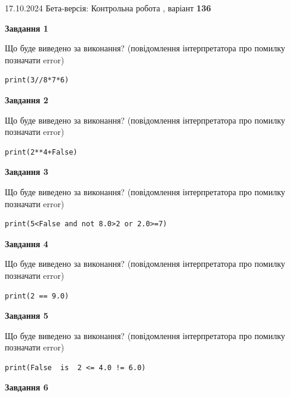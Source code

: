 \documentclass[12pt, ukrainian]{article}
\begin{document}
{\Large{17.10.2024 Бета-версія: Контрольна робота , варіант  \No \textbf { 136 }\par}}
{
\begin {large}
{\begin {center}\textbf{Завдання 1}\end {center}}

Що буде виведено за виконання? (повідомлення інтерпретатора про помилку позначати error)\par
\begin{verbatim}
print(3//8*7*6)
\end{verbatim}

{\begin {center}\textbf{Завдання 2}\end {center}}

Що буде виведено за виконання? (повідомлення інтерпретатора про помилку позначати error)\par
\begin{verbatim}
print(2**4+False)
\end{verbatim}

{\begin {center}\textbf{Завдання 3}\end {center}}

Що буде виведено за виконання? (повідомлення інтерпретатора про помилку позначати error)\par
\begin{verbatim}
print(5<False and not 8.0>2 or 2.0>=7)
\end{verbatim}

{\begin {center}\textbf{Завдання 4}\end {center}}

Що буде виведено за виконання? (повідомлення інтерпретатора про помилку позначати error)\par
\begin{verbatim}
print(2 == 9.0)
\end{verbatim}

{\begin {center}\textbf{Завдання 5}\end {center}}

Що буде виведено за виконання? (повідомлення інтерпретатора про помилку позначати error)\par
\begin{verbatim}
print(False  is  2 <= 4.0 != 6.0)
\end{verbatim}

{\begin {center}\textbf{Завдання 6}\end {center}}


\end{large}}
\end{document}
